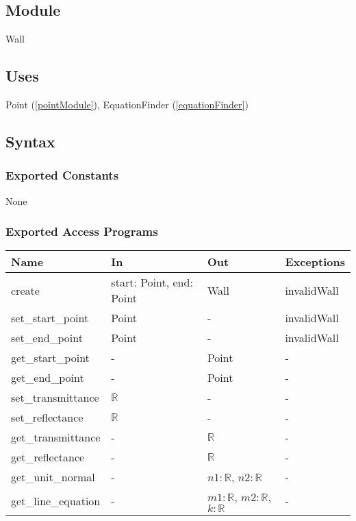 \documentclass[12pt, titlepage]{article}
\begin{document}
\subsection{Module}

Wall

\subsection{Uses}

Point (\autoref{pointModule}), EquationFinder (\autoref{equationFinder})

\subsection{Syntax}

\subsubsection{Exported Constants}

None

\subsubsection{Exported Access Programs}

\begin{center}
\begin{tabular}{p{4cm} p{2.3cm} p{3cm} p{3cm}}
\hline
\textbf{Name} & \textbf{In} & \textbf{Out} & \textbf{Exceptions} \\
\hline
create & start: Point, end: Point & Wall & invalidWall \\
set\_start\_point & Point & - & invalidWall \\
set\_end\_point & Point & - & invalidWall \\
get\_start\_point & - & Point & - \\
get\_end\_point & - & Point & - \\
set\_transmittance & $\mathbb{R}$ & - & - \\
set\_reflectance & $\mathbb{R}$ & - & - \\
get\_transmittance & - & $\mathbb{R}$ & - \\
get\_reflectance & - & $\mathbb{R}$ & - \\
get\_unit\_normal & - & $n1: \mathbb{R}$,  $n2: \mathbb{R}$ & - \\
get\_line\_equation & - & $m1: \mathbb{R}$, $m2: \mathbb{R}$, $k: \mathbb{R}$ & - \\
\hline
\end{tabular}
\end{center}
\end{document}
